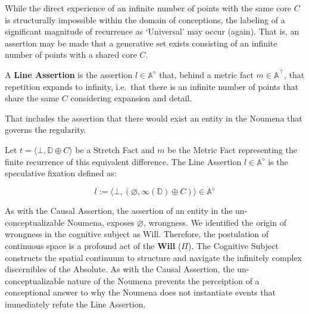 While the direct experience of an infinite number of points with the same core
$C$ is structurally impossible within the domain of conceptions, the labeling
of a significant magnitude of recurrence as `Universal' may occur (again). That
is, an assertion may be made that a generative set exists consisting of an 
infinite number of points with a shared core $C$. 

\begin{formalism}

    A \textbf{Line Assertion} is the assertion $l \in \mathbb{A}^\diamond$
    that, behind a metric fact $m \in \mathbb{A}^\top$, that repetition
    expands to infinity, i.e.\ that there is an infinite number of points
    that share the same $C$ considering expansion and detail. 

    That includes the assertion that there would exist an entity in the Noumena
    that governs the regularity.

    Let $t = \langle \bot, \mathbb{D} \oplus C \rangle$ be a Stretch Fact and $m$ 
    be the Metric Fact representing the finite recurrence of this equivalent 
    difference. The Line Assertion $l \in \mathbb{A}^\diamond$ is the speculative 
    fixation defined as:

    \begin{equation}
        l := \langle \bot, (\varnothing, \infty(\mathbb{D}) \oplus C) \rangle \in \mathbb{A}^\diamond
    \end{equation}

\end{formalism}

As with the Causal Assertion, the assertion of an entity in the
un-conceptualizable Noumena, exposes $\varnothing$, wrongness. We identified
the origin of wrongness in the cognitive subject as Will. Therefore, the
postulation of continuous space is a profound act of the \textbf{Will} ($\Pi$).
The Cognitive Subject constructs the spatial continuum to structure and
navigate the infinitely complex discernibles of the Absolute. As with the Causal
Assertion, the un-conceptualizable nature of the Noumena prevents the
perceiption of a conceptional answer to why the Noumena does not instantiate 
events that immediately refute the Line Assertion.

